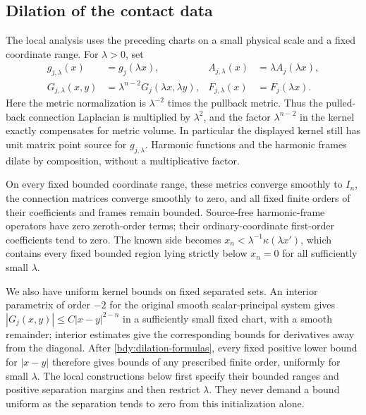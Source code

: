 \subsection{Dilation of the contact data}\label{bdy:dilation}

The local analysis uses the preceding charts on a small physical
scale and a fixed coordinate range.  For \(\lambda>0\), set
\begin{equation}\label{bdy:dilation-formulas}
 \begin{aligned}
 g_{j,\lambda}(x)&=g_j(\lambda x),&
 A_{j,\lambda}(x)&=\lambda A_j(\lambda x),\\
 G_{j,\lambda}(x,y)&=\lambda^{n-2}G_j(\lambda x,\lambda y),&
 F_{j,\lambda}(x)&=F_j(\lambda x).
 \end{aligned}
\end{equation}
Here the metric normalization is \(\lambda^{-2}\) times the
pullback metric.  Thus the pulled-back connection Laplacian is
multiplied by \(\lambda^2\), and the factor
\(\lambda^{n-2}\) in the kernel exactly compensates for metric
volume.  In particular the displayed kernel still has unit
matrix point source for \(g_{j,\lambda}\).  Harmonic functions
and the harmonic frames dilate by composition, without a
multiplicative factor.

On every fixed bounded coordinate range, these metrics converge
smoothly to \(I_n\), the connection matrices converge smoothly
to zero, and all fixed finite orders of their coefficients and
frames remain bounded.  Source-free harmonic-frame operators
have zero zeroth-order terms; their ordinary-coordinate first-order
coefficients tend to zero.  The known side becomes
\(x_n<\lambda^{-1}\kappa(\lambda x')\), which contains every
fixed bounded region lying strictly below \(x_n=0\) for all
sufficiently small \(\lambda\).

We also have uniform kernel bounds on fixed separated sets.
An interior parametrix of order \(-2\) for the original smooth
scalar-principal system gives
\(|G_j(x,y)|\le C|x-y|^{2-n}\) in a sufficiently small fixed
chart, with a smooth remainder; interior estimates give the
corresponding bounds for derivatives away from the diagonal.
After \eqref{bdy:dilation-formulas}, every fixed positive lower
bound for \(|x-y|\) therefore gives bounds of any prescribed
finite order, uniformly for small \(\lambda\).  The local
constructions below first specify their bounded ranges and
positive separation margins and then restrict \(\lambda\).
They never demand a bound uniform as the separation tends to
zero from this initialization alone.

